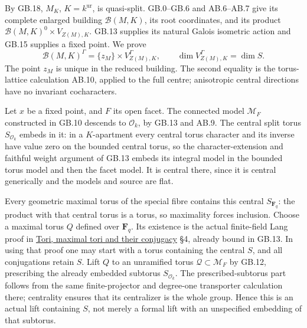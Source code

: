 \documentclass[
  11pt,
]{article}
\begin{document}
By GB.18, \(M_K\), \(K=k^{\mathrm{ur}}\), is quasi-split. GB.0--GB.6 and
AB.6--AB.7 give its complete enlarged building \(\mathcal B(M,K)\), its
root coordinates, and its product
\(\mathcal B(M,K)^0\times V_{Z(M),K}\). GB.13 supplies its natural
Galois isometric action and GB.15 supplies a fixed point. We prove \[
          \mathcal B(M,K)^\Gamma
                    =\{z_M\}\times V_{Z(M),K}^\Gamma,
       \qquad \dim V_{Z(M),K}^\Gamma=\dim S .                \tag{GB19.1}
\] The point \(z_M\) is unique in the reduced building. The second
equality is the torus-lattice calculation AB.10, applied to the full
centre; anisotropic central directions have no invariant cocharacters.

Let \(x\) be a fixed point, and \(F\) its open facet. The connected
model \(\mathcal M_F\) constructed in GB.10 descends to
\(\mathcal O_k\), by GB.13 and AB.9. The central split torus
\(S_{\mathcal O_k}\) embeds in it: in a \(K\)-apartment every central
torus character and its inverse have value zero on the bounded central
torus, so the character-extension and faithful weight argument of GB.13
embeds its integral model in the bounded torus model and then the facet
model. It is central there, since it is central generically and the
models and source are flat.

Every geometric maximal torus of the special fibre contains this central
\(S_{\mathbf F_q}\): the product with that central torus is a torus, so
maximality forces inclusion. Choose a maximal torus \(Q\) defined over
\(\mathbf F_q\). Its existence is the actual finite-field Lang proof in
\href{../AG-RG/AG-RG-01.html}{Tori, maximal tori and their conjugacy}
§4, already bound in GB.13. In using that proof one may start with a
torus containing the central \(S\), and all conjugations retain \(S\).
Lift \(Q\) to an unramified torus \(\mathcal Q\subset\mathcal M_F\) by
GB.12, prescribing the already embedded subtorus \(S_{\mathcal O_k}\).
The prescribed-subtorus part follows from the same finite-projector and
degree-one transporter calculation there; centrality ensures that its
centralizer is the whole group. Hence this is an actual lift containing
\(S\), not merely a formal lift with an unspecified embedding of that
subtorus.
\end{document}
